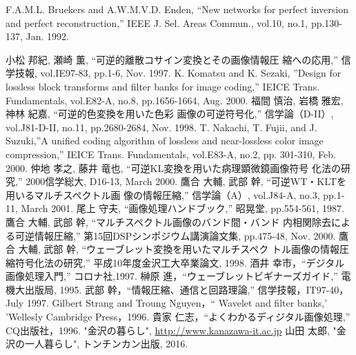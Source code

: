 \begin{thebibliography}{99}
F.A.M.L. Bruekers and A.W.M.V.D. Enden, ``New networks for
	perfect inversion and perfect reconstruction,'' IEEE
	J. Sel. Areas Commun., vol.10, no.1, pp.130-137,
	Jan. 1992. 

小松 邦紀, 瀬崎 薫, ``可逆的離散コサイン変換とその画像情報圧
	縮への応用,'' 信学技報, vol.IE97-83, pp.1-6, Nov. 1997.
K. Komatsu and K. Sezaki, ''Design for lossless block
	transforms and filter banks for image coding,'' IEICE
	Trans. Fundamentals, vol.E82-A, no.8, pp.1656-1664,
	Aug. 2000.
福間 慎治, 岩橋 雅宏, 神林 紀嘉, ``可逆的色変換を用いた色彩
	画像の可逆符号化,'' 信学論（D-II）, vol.J81-D-II, no.11, pp.2680-2684, Nov. 1998.
 T. Nakachi, T. Fujii, and J. Suzuki,''A unified coding
	algorithm of lossless and near-lossless color image
	compression,'' IEICE Trans. Fundamentals, vol.E83-A, no.2,
	pp. 301-310, Feb. 2000.
仲地 孝之, 藤井 竜也, ``可逆KL変換を用いた病理顕微鏡画像符号
	化法の研究,'' 2000信学総大, D16-13, March 2000.
鷹合 大輔, 武部 幹, ``可逆WT・KLTを用いるマルチスペクトル画
	像の情報圧縮,'' 信学論（A）, vol.J84-A, no.3, pp.1-11, March
	2001.
尾上 守夫, ``画像処理ハンドブック,'' 昭晃堂, pp.554-561, 1987.
鷹合 大輔, 武部 幹, ``マルチスペクトル画像のバンド間・バンド
	内相関除去による可逆情報圧縮,'' 第15回DSPシンポジウム講演論文集, pp.475-48, Nov.
	2000.
鷹合 大輔, 武部 幹, ``ウェーブレット変換を用いたマルチスペク
	トル画像の情報圧縮符号化法の研究,'' 平成10年度金沢工大卒業論文,
	1998.
酒井 幸市，``デジタル画像処理入門,'' コロナ社,1997.
榊原 進，``ウェーブレットビギナーズガイド,'' 電機大出版局,
	 1995.
武部 幹，``情報圧縮、通信と回路理論,'' 信学技報，IT97-40，July
	1997.
Gilbert Strang and Troung Nguyen，``
Wavelet and filter banks,' 'Wellesly Cambridge Press，1996.
貴家 仁志，``よくわかるディジタル画像処理,'' CQ出版社，1996.
 "金沢の暮らし", \url{http://www.kanazawa-it.ac.jp}
 山田 太郎, "金沢の一人暮らし", トンチンカン出版, 2016.
 \end{thebibliography}
 
